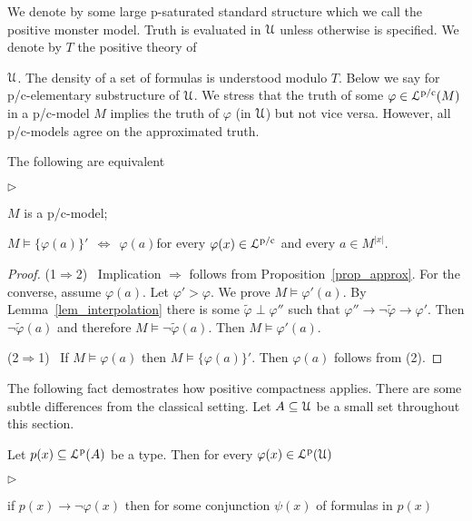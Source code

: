 \documentclass{amsproc}
\newcommand{\mylabel}[1]{{#1}\hfill}
\renewenvironment{itemize}
  {\begin{list}{$\triangleright$}{%
  \setlength{\parskip}{0mm}
  \setlength{\topsep}{.4\baselineskip}
  \setlength{\rightmargin}{0mm}
  \setlength{\listparindent}{0mm}
  \setlength{\itemindent}{0mm}
  \setlength{\labelwidth}{3ex}
  \setlength{\itemsep}{.2\baselineskip}
  \setlength{\parsep}{.2\baselineskip}
  \setlength{\partopsep}{0mm}
  \setlength{\labelsep}{1ex}
  \setlength{\leftmargin}{\labelwidth+\labelsep}
  \let\makelabel\mylabel}}{%
\end{list}}
\renewcommand*{\emph}[1]{%
   \smash{\tikz[baseline]\node[rectangle, fill=teal!25, rounded corners, inner xsep=0.5ex, inner ysep=0.2ex, anchor=base, minimum height = 2.7ex]{\strut #1};}}
\begin{document}
\def\ceq#1#2#3{\parbox[t]{18ex}{$\displaystyle #1$}\parbox{6ex}{\hfil $#2$}{$\displaystyle #3$}}

We denote by \emph{${\EuScript U}$\/} some large p-saturated standard structure which we call the positive monster model.
Truth is evaluated in ${\EuScript U}$ unless otherwise is specified.
We denote by $T$ the positive theory of {${\EuScript U}$.
The density of a set of formulas is understood modulo $T$.
Below we say \emph{p/c-model\/} for p/c-elementary substructure of ${\EuScript U}$.
We stress that the truth of some $\varphi\in{\EuScript L}^{\rm p/c}(M)$ in a p/c-model $M$ implies the truth of $\varphi$ (in ${\EuScript U}$) but not vice versa.
However, all p/c-models agree on the approximated truth.

\begin{fact}
  The following are equivalent 
  \begin{itemize}
    \item[1.] $M$ is a p/c-model;
    \item[2.] $M\models\big\{\varphi(a)\big\}'\ \ \Leftrightarrow\ \ \varphi(a)$\quad for every $\varphi(x)\in{\EuScript L}^{\rm p/c}$ and every $a\in M^{|x|}$.
  \end{itemize}
\end{fact}

\begin{proof}
  (1$\Rightarrow$2) \ Implication $\Rightarrow$ follows from Proposition~\ref{prop_approx}.
  For the converse, assume $\varphi(a)$.
  Let $\varphi'>\varphi$.
  We prove $M\models\varphi'(a)$.
  By Lemma~\ref{lem_interpolation} there is some $\tilde\varphi\perp\varphi''$ such that $\varphi''\rightarrow\neg\tilde\varphi\rightarrow\varphi'$.
  Then $\neg\tilde\varphi(a)$ and therefore  $M\models\neg\tilde\varphi(a)$.
  Then $M\models\varphi'(a)$.

  (2$\Rightarrow$1) \ If $M\models\varphi(a)$ then $M\models\big\{\varphi(a)\big\}'$.
  Then $\varphi(a)$ follows from (2).
\end{proof}

The following fact demostrates how positive compactness applies.
There are some subtle differences from the classical setting.
Let $A\subseteq{\EuScript U}$ be a small set throughout this section.

\begin{fact}\label{fact_compactness_imp}
  Let $p(x)\subseteq{\EuScript L}^{\rm p}(A)$ be a type.
  Then for every  $\varphi(x)\in{\EuScript L}^{\rm p}({\EuScript U})$
  \begin{itemize}
    \item[i.] if $p(x)\rightarrow\neg\varphi(x)$ then for some conjunction $\psi(x)$ of formulas in $p(x)$
    

\end{itemize}
\end{fact}}
\end{document}
